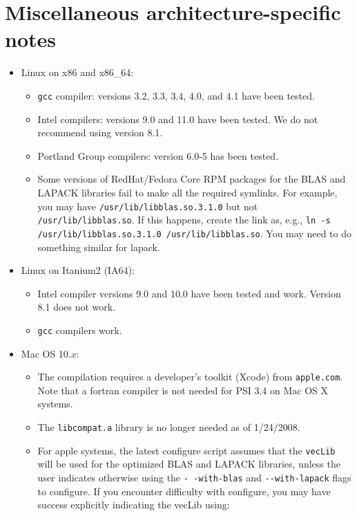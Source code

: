 \documentclass[12pt]{article}
\begin{document}
\section{Miscellaneous architecture-specific notes}
\begin{itemize}

\item Linux on x86 and x86\_64:
  \begin{itemize}
   \item {\tt gcc} compiler: versions 3.2, 3.3, 3.4, 4.0, and 4.1 have been tested.
   \item Intel compilers: versions 9.0 and 11.0 have been tested. We do not 
   recommend using version 8.1.
   \item Portland Group compilers: version 6.0-5 has been tested.
   \item Some versions of RedHat/Fedora Core RPM packages for the 
   BLAS and LAPACK libraries fail to make all the required symlinks.  
   For example, you may have {\tt /usr/lib/libblas.so.3.1.0} but not
   {\tt /usr/lib/libblas.so}.  If this happens, create the link as, e.g.,
   {\tt ln -s /usr/lib/libblas.so.3.1.0 /usr/lib/libblas.so}.  You
   may need to do something similar for lapack.
  \end{itemize}

\item Linux on Itanium2 (IA64):
  \begin{itemize}
   \item Intel compiler versions 9.0 and 10.0 have been tested and work.
   Version 8.1 does not work.  
   \item {\tt gcc} compilers work.
  \end{itemize}

\item Mac OS 10.$x$:

  \begin{itemize}
  \item The compilation requires a developer's toolkit (Xcode) from
    {\tt apple.com}.  Note that a fortran compiler is not needed for
    PSI 3.4 on Mac OS X systems.

  \item The {\tt libcompat.a} library is no longer needed as of 1/24/2008.

  \item For apple systems, the latest configure script assumes that the
  {\tt vecLib} will be used for the optimized BLAS and LAPACK
  libraries, unless the user indicates otherwise using the {\tt -}{\tt
    -with-blas} and {\tt -}{\tt -with-lapack} flags to configure.  If
  you encounter difficulty with configure, you may have success
  explicitly indicating the vecLib using:


\end{itemize}
\end{itemize}
\end{document}
